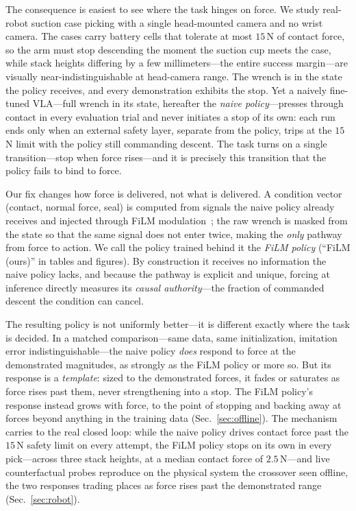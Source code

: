 The consequence is easiest to see where the task hinges on force. We
study real-robot suction case picking with a single head-mounted camera and no wrist camera.
The cases carry battery cells that tolerate at most $15$\,N of contact force, so the arm must
stop descending the moment the suction cup meets the case, while stack heights differing by a
few millimeters---the entire success margin---are visually near-indistinguishable at
head-camera range. The wrench is in the state the policy receives, and every demonstration
exhibits the stop. Yet a naively fine-tuned VLA---full wrench in its state, hereafter the
\emph{naive policy}---presses through contact in every evaluation trial and never initiates a
stop of its own: each run ends only when an external safety layer, separate from the policy,
trips at the $15$\,N limit with the policy still commanding descent. The task turns on a
single transition---stop when force rises---and it is precisely this transition that the
policy fails to bind to force.

Our fix changes how force is delivered, not what is delivered. A condition vector \chat{}
(contact, normal force, seal) is computed from signals the naive policy already receives
and injected through FiLM modulation~\cite{perez2018film}; the raw wrench is masked from the
state so that the same signal does not enter twice, making \chat{} the \emph{only} pathway from
force to action. We call the policy trained behind it the \emph{FiLM policy} (``FiLM (ours)''
in tables and figures). By
construction it receives no information the naive policy lacks, and because the pathway is
explicit and unique, forcing \chat{} at inference directly measures its \emph{causal
authority}---the fraction of commanded descent the condition can cancel.

The resulting policy is not uniformly better---it is different exactly where the task is
decided. In a matched comparison---same data, same initialization, imitation error
indistinguishable---the naive policy \emph{does} respond to force at the demonstrated
magnitudes, as strongly as the FiLM policy or more so. But its response is a
\emph{template}: sized to the demonstrated forces, it fades or saturates as force rises past
them, never strengthening into a stop. The FiLM policy's response instead grows with
force, to the point of stopping and
backing away at forces beyond anything in the training data (Sec.~\ref{sec:offline}). The
mechanism carries to the real closed loop: while the naive policy drives contact force past the
$15$\,N safety limit on every attempt, the FiLM policy stops on its own in every
pick---across three stack heights, at a median contact force of $2.5$\,N---and live
counterfactual probes reproduce on the physical system the crossover seen offline, the two
responses trading places as force rises past the demonstrated range (Sec.~\ref{sec:robot}).

